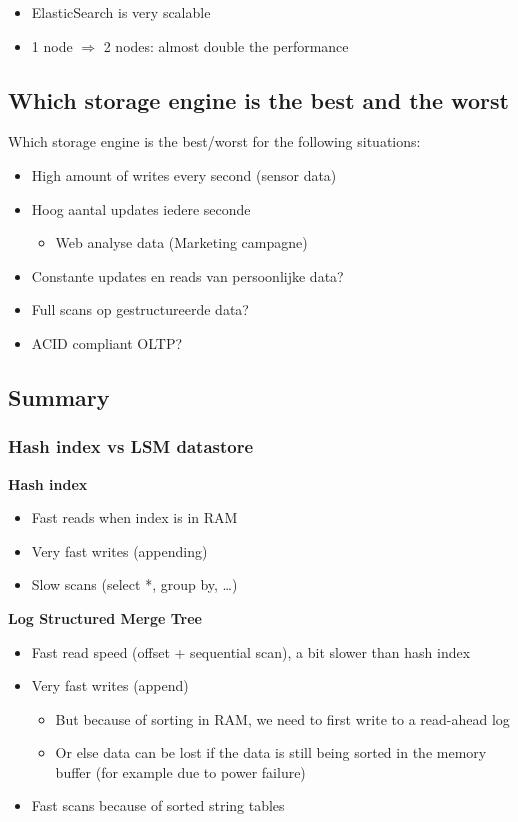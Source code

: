\documentclass{article}
\begin{document}
\begin{itemize}
    \item ElasticSearch is very scalable
    \item 1 node $\Rightarrow$ 2 nodes: almost double the performance
\end{itemize}

\subsection{Which storage engine is the best and the worst}

Which storage engine is the best/worst for the following situations:

\begin{itemize}
    \item High amount of writes every second (sensor data)
    \item Hoog aantal updates iedere seconde 
    \begin{itemize}
        \item Web analyse data (Marketing campagne)
    \end{itemize} 
    \item Constante updates en reads van persoonlijke data? 
    \item Full scans op gestructureerde data?
    \item ACID compliant OLTP?
\end{itemize}

\subsection{Summary}

\subsubsection{Hash index vs LSM datastore}

\textbf{Hash index}

\begin{itemize}
    \item Fast reads when index is in RAM
    \item Very fast writes (appending)
    \item Slow scans (select *, group by, \dots)
\end{itemize}

\textbf{Log Structured Merge Tree}

\begin{itemize}
    \item Fast read speed (offset + sequential scan), a bit slower than hash index
    \item Very fast writes (append)
    \begin{itemize}
        \item But because of sorting in RAM, we need to first write to a read-ahead log
        \item Or else data can be lost if the data is still being sorted in the memory buffer (for example due to power failure)
    \end{itemize}
    \item Fast scans because of sorted string tables
\end{itemize}
\end{document}
